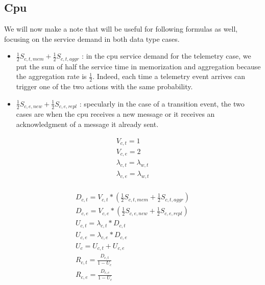 \documentclass[11pt]{article}
\begin{document}
\subsection{Cpu}
We will now make a note that will be useful for following formulas as well, focusing on the service demand in both data type cases.\\
\begin{itemize}
\item $\frac{1}{2}S_{c, t, mem} + \frac{1}{2}S_{c, t, aggr}$ : in the cpu service demand for the telemetry case, we put the sum of half the service time in memorization and aggregation because the aggregation rate is $\frac{1}{2}$. Indeed, each time a telemetry event arrives can trigger one of the two actions with the same probability.
\item $\frac{1}{2}S_{c, e, new} + \frac{1}{2}S_{c, e, repl}$ : specularly in the case of a transition event, the two cases are when the cpu receives a new message or it receives an acknowledgment of a message it already sent.
\end{itemize}

\begin{equation}
    \begin{array}{l}
        V_{c, t} = 1 \\
        V_{c, e} = 2 \\ %
        \lambda_{c, t} = \lambda_{w, t} \\
        \lambda_{c, e} = \lambda_{w, t} \\
    \end{array}
\end{equation}

\begin{equation}
    \begin{array}{l}
        D_{c, t} = V_{c, t} * (\frac{1}{2}S_{c, t, mem} + \frac{1}{2}S_{c, t, aggr}) \\ %
        D_{c, e} = V_{c, e} * (\frac{1}{2}S_{c, e, new} + \frac{1}{2}S_{c, e, repl}) \\
        U_{c, t} = \lambda_{c, t} * D_{c, t} \\
        U_{c, e} = \lambda_{c, e} * D_{c, e} \\
        U_{c} = U_{c, t} + U_{c, e} \\
        R_{c, t} = \frac{D_{c, t}}{1 - U_{c}} \\
        R_{c, e} = \frac{D_{c, e}}{1 - U_{c}} \\
    \end{array}
\end{equation}
\end{document}
